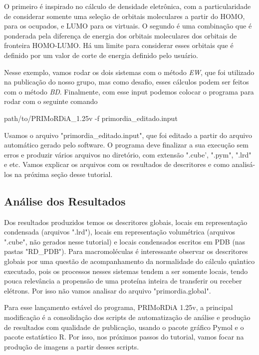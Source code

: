 \documentclass[a4paper,11pt]{refart}
\begin{document}
	O primeiro é inspirado no cálculo de densidade eletrônica, com a particularidade de considerar somente uma seleção de orbitais moleculares a partir do HOMO, para os ocupados, e LUMO para os virtuais. O segundo é uma combinação que é ponderada pela diferença de energia dos orbitais moleculares dos orbitais de fronteira HOMO-LUMO. Há um limite para considerar esses orbitais que é definido por um valor de corte de energia definido pelo usuário.
	
	Nesse exemplo, vamos rodar os dois sistemas com o método \textit{EW}, que foi utilizado na publicação do nosso grupo, mas como desafio, esses cálculos podem ser feitos com o método \textit{BD}.	Finalmente, com esse input podemos colocar o programa para rodar com o seguinte comando
	
	
	\hspace*{-\leftmarginwidth}
	\begin{minipage}{\fullwidth}
		\begin{commandshell}path/to/PRIMoRDiA_1.25v -f primordia\_editado.input\end{commandshell}
	\end{minipage}
	
	Usamos o arquivo "primordia\_editado.input", que foi editado a partir do arquivo automático gerado pelo software.
	O programa deve finalizar a sua execução sem erros e produzir vários arquivos no diretório, com extensão ".cube', ".pym", ".lrd" e etc. Vamos explicar os arquivos com os resultados de descritores e como analisá-los na próxima seção desse tutorial.
	
	\subsection{Análise dos Resultados}	
	
	Dos resultados produzidos temos os descritores globais, locais em representação condensada (arquivos ".lrd"), locais em representação volumétrica (arquivos ".cube", não gerados nesse tutorial) e locais condensados escritos em PDB (nas pastas "RD\_PDB"). Para macromoléculas é interessante observar os descritores globais por uma questão de acompanhamento da normalidade do cálculo quântico executado, pois os processos nesses sistemas tendem a ser somente locais, tendo pouca relevância a propensão de uma proteína inteira de transferir ou receber elétrons. Por isso não vamos analisar do arquivo "primordia.global".
	
	Para esse lançamento estável do programa, PRIMoRDiA 1.25v, a principal modificação é a consolidação dos scripts de automatização de análise e produção de resultados com qualidade de publicação, usando o pacote gráfico Pymol e o pacote estatístico R. Por isso, nos próximos passos do tutorial, vamos focar na produção de imagens a partir desses scripts.
	
\end{document}
